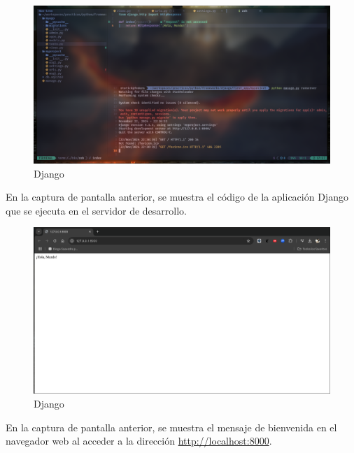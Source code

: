 \documentclass[
  a4paper,
  DIV=11,
  numbers=noendperiod,
  onepage,
  openany]{scrreprt}
\begin{document}
\begin{figure}[H]

{\centering \includegraphics[width=8.33333in,height=\textheight,keepaspectratio]{unidades/unidad7/./images/django_code001.png}

}

\caption{Django}

\end{figure}%

En la captura de pantalla anterior, se muestra el código de la
aplicación Django que se ejecuta en el servidor de desarrollo.

\begin{figure}[H]

{\centering \includegraphics[width=8.33333in,height=\textheight,keepaspectratio]{unidades/unidad7/./images/django_code002.png}

}

\caption{Django}

\end{figure}%

En la captura de pantalla anterior, se muestra el mensaje de bienvenida
en el navegador web al acceder a la dirección
\url{http://localhost:8000}.
\end{document}
